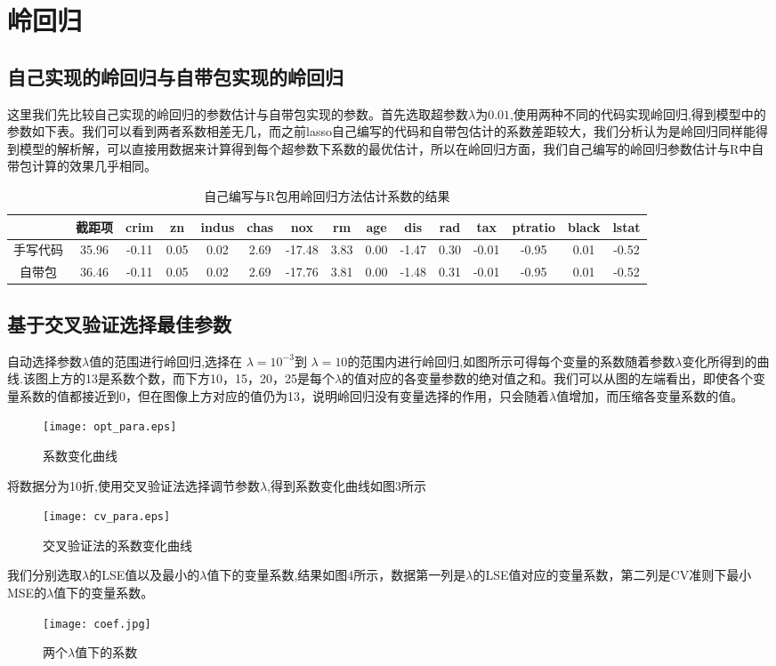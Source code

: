 \section{岭回归}
\subsection{自己实现的岭回归与自带包实现的岭回归}
这里我们先比较自己实现的岭回归的参数估计与自带包实现的参数。首先选取超参数$\lambda$为$0.01$,使用两种不同的代码实现岭回归,得到模型中的参数如下表。我们可以看到两者系数相差无几，而之前lasso自己编写的代码和自带包估计的系数差距较大，我们分析认为是岭回归同样能得到模型的解析解，可以直接用数据来计算得到每个超参数下系数的最优估计，所以在岭回归方面，我们自己编写的岭回归参数估计与R中自带包计算的效果几乎相同。

\begin{table}[htbp]
\centering
\caption{自己编写与R包用岭回归方法估计系数的结果}
\begin{tabular}{ccccccccccccccc}
  \hline
 & 截距项 & crim & zn & indus & chas & nox & rm & age & dis & rad & tax & ptratio & black & lstat \\ 
  \hline
  手写代码 & 35.96 & -0.11 & 0.05 & 0.02 & 2.69 & -17.48 & 3.83 & 0.00 & -1.47 & 0.30 & -0.01 & -0.95 & 0.01 & -0.52 \\ 
  自带包& 36.46 & -0.11 &  0.05 &  0.02  & 2.69 &-17.76 &3.81  & 0.00&  -1.48&   0.31 & -0.01&  -0.95&0.01&-0.52\\
   \hline
\end{tabular}
\end{table}

\subsection{基于交叉验证选择最佳参数}

自动选择参数$\lambda$值的范围进行岭回归,选择在 $\lambda =10^{-3}$到 $\lambda = 10$的范围内进行岭回归,如图所示可得每个变量的系数随着参数$\lambda$变化所得到的曲线.该图上方的13是系数个数，而下方10，15，20，25是每个$\lambda$的值对应的各变量参数的绝对值之和。我们可以从图的左端看出，即使各个变量系数的值都接近到0，但在图像上方对应的值仍为13，说明岭回归没有变量选择的作用，只会随着$\lambda$值增加，而压缩各变量系数的值。
\begin{figure}[htbp]
  \centering
  \texttt{[image: opt\_para.eps]}
  \caption{系数变化曲线}
\end{figure}

将数据分为10折,使用交叉验证法选择调节参数$\lambda$,得到系数变化曲线如图3所示
\begin{figure}[htbp]
  \centering
  \texttt{[image: cv\_para.eps]}
  \caption{交叉验证法的系数变化曲线}
\end{figure}

我们分别选取$\lambda$的LSE值以及最小的$\lambda$值下的变量系数,结果如图4所示，数据第一列是$\lambda$的LSE值对应的变量系数，第二列是CV准则下最小MSE的$\lambda$值下的变量系数。
\begin{figure}[htbp]
  \centering
  \texttt{[image: coef.jpg]}
  \caption{两个$\lambda$值下的系数}
\end{figure}
